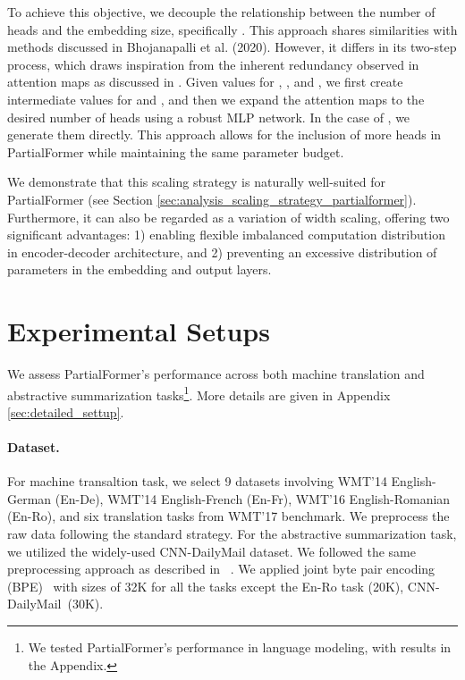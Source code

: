 \documentclass[11pt]{article}
\begin{document}
To achieve this objective, we decouple the relationship between the number of heads and the embedding size, specifically . This approach shares similarities with methods discussed in Bhojanapalli et al. (2020). However, it differs in its two-step process, which draws inspiration from the inherent redundancy observed in attention maps as discussed in \citet{michel2019sixteen, clark-etal-2019-bert, voita-etal-2019-analyzing, nguyen2022improving}. Given values for , , and , we first create intermediate values for  and , and then we expand the attention maps to the desired number of heads using a robust MLP network. In the case of , we generate them directly. This approach allows for the inclusion of more heads in PartialFormer while maintaining the same parameter budget.

We demonstrate that this scaling strategy is naturally well-suited for PartialFormer (see Section \ref{sec:analysis_scaling_strategy_partialformer}). Furthermore, it can also be regarded as a variation of width scaling, offering two significant advantages: 1) enabling flexible imbalanced computation distribution in encoder-decoder architecture, and 2) preventing an excessive distribution of parameters in the embedding and output layers.





\section{Experimental Setups}
We assess PartialFormer's performance across both machine translation and abstractive summarization tasks\footnote{We tested PartialFormer's performance in language modeling, with results in the Appendix.}. More details are given in Appendix \ref{sec:detailed_settup}.

\paragraph{Dataset.} For machine transaltion task, we select 9 datasets involving WMT'14 English-German (En-De), WMT'14 English-French (En-Fr), WMT'16 English-Romanian (En-Ro), and six translation tasks from WMT'17 benchmark. We preprocess the raw data following the standard strategy. For the abstractive summarization task, we utilized the widely-used CNN-DailyMail dataset. We followed the same preprocessing approach as described in ~\citet{ott-etal-2019-fairseq}. We applied joint byte pair encoding (BPE)~\cite{sennrich-etal-2016-neural} with sizes of 32K for all the tasks except the En-Ro task (20K), CNN-DailyMail~(30K). 
 
\end{document}
